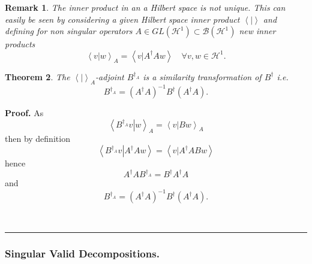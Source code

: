 \documentclass[aps,preprint]{revtex4}%
\newtheorem{theorem}{Theorem}
\newtheorem{remark}[theorem]{Remark}
\newenvironment{proof}[1][Proof]{\noindent\textbf{#1.} }{\ \rule{0.5em}{0.5em}}
\begin{document}
\begin{remark}
\emph{The inner product in an a Hilbert space is not unique. This can easily
be seen by considering a given Hilbert space inner product }$\left\langle
\left.  {}\right\vert \right\rangle $ and defining for non singular operators
$A\in GL\left(  \mathcal{H}^{1}\right)  \subset\mathcal{B}\left(
\mathcal{H}^{1}\right)  $ new inner products \emph{ }%
\begin{equation}
\left\langle \left.  v\right\vert w\right\rangle _{A}=\left\langle \left.
v\right\vert A^{\dagger}Aw\right\rangle \quad\forall v,w\in\mathcal{H}^{1}.
\end{equation}

\end{remark}

\begin{theorem}
The $\left\langle \left.  {}\right\vert \right\rangle _{A}$-adjoint
$B^{\dagger_{A}}$ is a similarity transformation of $B^{\dagger}$ i.e.
\begin{equation}
B^{\dagger_{A}}=\left(  A^{\dagger}A\right)  ^{-1}B^{\dagger}\left(
A^{\dagger}A\right)  .
\end{equation}

\end{theorem}

\begin{proof}
As%
\begin{equation}
\left\langle \left.  B^{\dagger_{A}}v\right\vert w\right\rangle _{A}%
=\left\langle \left.  v\right\vert Bw\right\rangle _{A}%
\end{equation}
then by definition
\begin{equation}
\left\langle \left.  B^{\dagger_{A}}v\right\vert A^{\dagger}Aw\right\rangle
=\left\langle \left.  v\right\vert A^{\dagger}ABw\right\rangle
\end{equation}
hence
\begin{equation}
A^{\dagger}AB^{\dagger_{A}}=B^{\dagger}A^{\dagger}A
\end{equation}
and
\begin{equation}
B^{\dagger_{A}}=\left(  A^{\dagger}A\right)  ^{-1}B^{\dagger}\left(
A^{\dagger}A\right)  .
\end{equation}

\end{proof}

\subsubsection{Singular Valid Decompositions. \label{SVD}}
\end{document}
